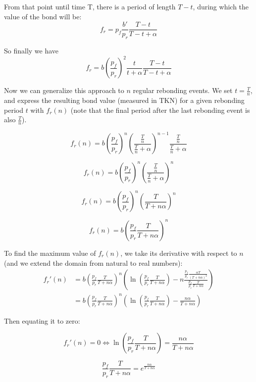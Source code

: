 \documentclass{article}
\begin{document}
From that point until time T, there is a period of length $T-t$, during which the value of the bond will be:
\begin{equation}
f_r = p_f\frac{b'}{p_r}\frac{T-t}{T-t+\alpha}
\end{equation}

So finally we have
\begin{equation}
  \label{eq:o-r}
f_r = b\left(\frac{p_f}{p_r}\right)^2\frac{t}{t+\alpha}\frac{T-t}{T-t+\alpha}
\end{equation}

Now we can generalize this approach to $n$ regular rebonding events. We set $t=\frac{T}{n}$, and express the resulting bond value (measured in TKN) for a given rebonding period $t$ with $f_r(n)$ (note that the final period after the last rebonding event is also $\frac{T}{n}$).

\[
f_r(n) = b \left(\frac{p_f}{p_r}\right)^n \left(\frac{\frac{T}{n}}{\frac{T}{n}+\alpha}\right)^{n-1} \frac{\frac{T}{n}}{\frac{T}{n}+\alpha}
\]

\[
f_r(n) = b \left(\frac{p_f}{p_r}\right)^n \left(\frac{\frac{T}{n}}{\frac{T}{n}+\alpha}\right)^{n}
\]

\[
f_r(n) = b \left(\frac{p_f}{p_r}\right)^n \left(\frac{T}{T + n\alpha}\right)^{n}
\]

\begin{equation}
  \label{eq:n-rebond_1}
f_r(n) = b \left(\frac{p_f}{p_r} \frac{T}{T+n \alpha} \right)^{n}
\end{equation}

To find the maximum value of $f_r(n)$, we take its derivative with respect to $n$ (and we extend the domain from natural to real numbers):
\[
\begin{split}
  f_r'(n) &= b \left(\frac{p_f}{p_r} \frac{T}{T+n\alpha}\right)^n \left(\ln\left(\frac{p_f}{p_r} \frac{T}{T+n\alpha}\right) - n \frac{\frac{p_f}{p_r} \frac{\alpha T}{(T+n\alpha)^2}}{\frac{p_f}{p_r} \frac{T}{T+n\alpha}}\right) \\
  &= b \left(\frac{p_f}{p_r} \frac{T}{T+n\alpha}\right)^n \left(\ln\left(\frac{p_f}{p_r} \frac{T}{T+n\alpha}\right) - \frac{n\alpha}{T+n\alpha}\right)
\end{split}
\]

Then equating it to zero:

\[
f_r'(n) = 0 \iff \ln\left(\frac{p_f}{p_r} \frac{T}{T+n\alpha}\right) = \frac{n\alpha}{T+n\alpha}
\]

\[
\frac{p_f}{p_r} \frac{T}{T+n\alpha} = e^{\frac{n\alpha}{T+n\alpha}}
\]
\end{document}
